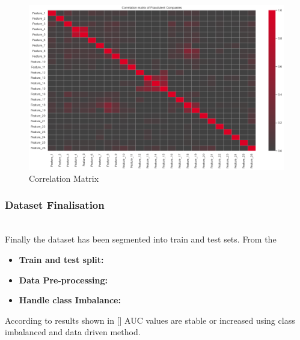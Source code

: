 \begin{figure}[H]
    \centering
    \includegraphics[width=\linewidth]{figures/corr.png}
    \caption{Correlation Matrix}
    \label{fig:corr}
\end{figure}

\subsubsection{Dataset Finalisation}\hspace*{\fill} \\
Finally the dataset has been segmented into train and test sets. From the
\begin{itemize}
    \item \textbf{Train and test split:}
    \item \textbf{Data Pre-processing:}
    \item \textbf{Handle class Imbalance:}
\end{itemize}

According to results shown in [] AUC values are stable or increased using class imbalanced and data driven method. 



